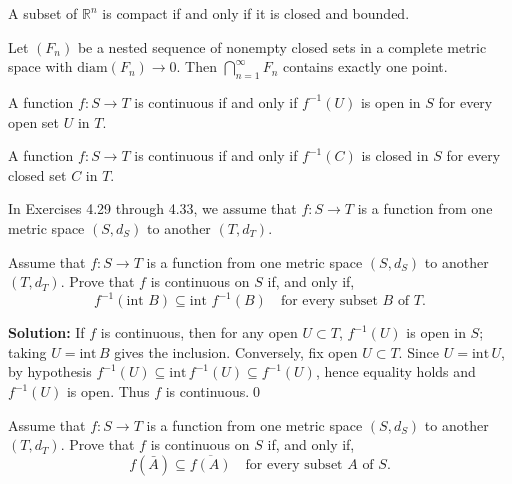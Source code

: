 \begin{theorem}
A subset of $\mathbb{R}^n$ is compact if and only if it is closed and bounded.
\end{theorem}

\begin{theorem}
Let $(F_n)$ be a nested sequence of nonempty closed sets in a complete metric space with $\text{diam}(F_n) \to 0$. Then $\bigcap_{n=1}^{\infty} F_n$ contains exactly one point.
\end{theorem}

\begin{theorem}
A function $f: S \to T$ is continuous if and only if $f^{-1}(U)$ is open in $S$ for every open set $U$ in $T$.
\end{theorem}

\begin{theorem}
A function $f: S \to T$ is continuous if and only if $f^{-1}(C)$ is closed in $S$ for every closed set $C$ in $T$.
\end{theorem}

In Exercises 4.29 through 4.33, we assume that $f:S\to T$ is a function from one metric space $(S,d_S)$ to another $(T,d_T)$.



\begin{problembox}
Assume that $f : S \rightarrow T$ is a function from one metric space $(S, d_S)$ to another $(T, d_T)$. Prove that $f$ is continuous on $S$ if, and only if,
\[ f^{-1}(\text{int } B) \subseteq \text{int } f^{-1}(B) \quad \text{for every subset } B \text{ of } T. \]
\end{problembox}

\noindent\textbf{Solution:}
If $f$ is continuous, then for any open $U\subset T$, $f^{-1}(U)$ is open in $S$; taking $U=\mathrm{int}\,B$ gives the inclusion. Conversely, fix open $U\subset T$. Since $U=\mathrm{int}\,U$, by hypothesis $f^{-1}(U)\subseteq\mathrm{int}\,f^{-1}(U)\subseteq f^{-1}(U)$, hence equality holds and $f^{-1}(U)$ is open. Thus $f$ is continuous.\qed



\begin{problembox}
Assume that $f : S \rightarrow T$ is a function from one metric space $(S, d_S)$ to another $(T, d_T)$. Prove that $f$ is continuous on $S$ if, and only if,
\[ f(\bar{A}) \subseteq \overline{f(A)} \quad \text{for every subset } A \text{ of } S. \]
\end{problembox}

